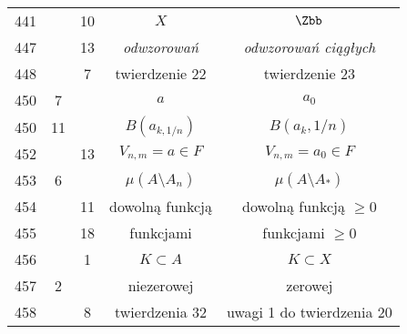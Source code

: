 \documentclass[a4paper,11pt]{article}
\numberwithin{equation}{section}
\begin{document}
\begin{center}
\begin{tabular}{|c|c|c|c|c|}
    441 & & 10 & $X$ & $\Zbb$ \\
    447 & & 13 & \textit{odwzorowań} & \textit{odwzorowań ciągłych} \\
    448 & &  7 & twierdzenie 22 & twierdzenie 23 \\
    450 &  7 & & $a$ & $a_{ 0 }$ \\
    450 & 11 & & $B( a_{ k, 1 / n } )$ & $B( a_{ k }, 1 / n )$ \\
    452 & & 13 & $V_{ n, m } = a \in F$ & $V_{ n, m } = a_{ 0 } \in F$ \\
    453 &  6 & & $\mu( A \setminus A_{ n } )$ & $\mu( A \setminus A_{ * } )$ \\
    454 & & 11 & dowolną funkcją & dowolną funkcją $\geq 0$ \\
    455 & & 18 & funkcjami & funkcjami $\geq 0$ \\
    456 & &  1 & $K \subset A$ & $K \subset X$ \\
    457 &  2 & & niezerowej & zerowej \\
    458 & &  8 & twierdzenia 32 & uwagi 1 do twierdzenia 20 \\
    \hline
  \end{tabular}






\end{center}
\end{document}
